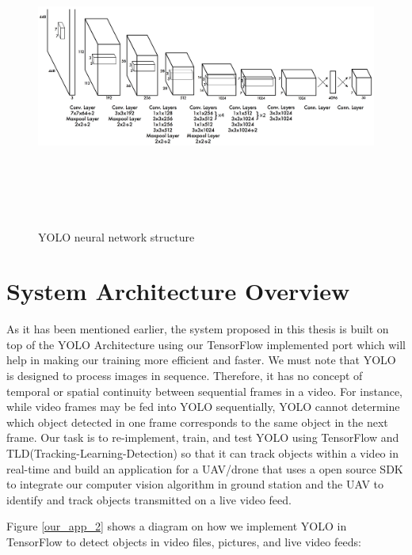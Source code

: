 \begin{figure}[h]
\setlength{\belowcaptionskip}{-30pt}
\centering
\includegraphics[width=12cm,height=10cm,keepaspectratio]{figures/yolo_net.jpg}
\caption{YOLO neural network structure}
\label{yolo_net}
\end{figure}

\vspace{10mm}
\section{ System Architecture Overview}

As it has been mentioned earlier, the system proposed in this thesis is built on top of the YOLO Architecture using our  TensorFlow implemented port  which will help in making our training more efficient and faster. We must note that YOLO is designed to process images in sequence. Therefore, it has no concept of temporal or spatial continuity between sequential frames in a video. For instance, while video frames may be fed into YOLO sequentially, YOLO cannot determine which object detected in one frame corresponds to the same object in the next frame.  Our task is to re-implement, train, and test  YOLO using TensorFlow and TLD(Tracking-Learning-Detection) so that it can track objects within a video in real-time and build  an application for a UAV/drone that uses a open source SDK to integrate our computer vision algorithm in ground station and the UAV to identify and track objects transmitted on a live video feed.

Figure \ref{our_app_2} shows a diagram on how we implement YOLO in TensorFlow to detect objects in video files, pictures, and live video feeds:

